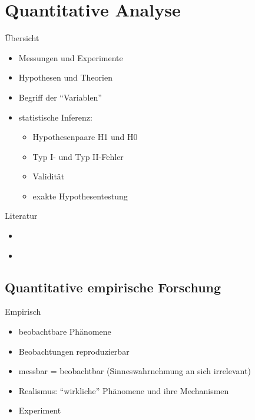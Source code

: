 \section[Quantitativ]{Quantitative Analyse}

\begin{frame}
  {Übersicht}
  \begin{itemize}[<+->]
    \item Messungen und Experimente
    \item Hypothesen und Theorien
    \item Begriff der "`Variablen"'
    \item statistische Inferenz:
      \begin{itemize}[<+->]
	\item Hypothesenpaare H1 und H0
	\item Typ I- und Typ II-Fehler
	\item Validität
	\item exakte Hypothesentestung
      \end{itemize}
  \end{itemize}
\end{frame}

\begin{frame}
  {Literatur}
  \begin{itemize}
    \item \alert{\citet[Kap.\ 1 und 2]{MaxwellDelaney2004}}
    \item \citet[Kap.\ 1]{GravetterWallnau2007}
  \end{itemize}
\end{frame}

\subsection{Quantitative empirische Forschung}

\begin{frame}
  {Empirisch}
  \begin{itemize}[<+->]
    \item beobachtbare Phänomene
    \item Beobachtungen reproduzierbar
    \item messbar = beobachtbar (Sinneswahrnehmung an sich irrelevant)
    \item Realismus: "`wirkliche"' Phänomene und ihre Mechanismen
      \Zeile
    \item \alert{Experiment}
  \end{itemize}
\end{frame}

